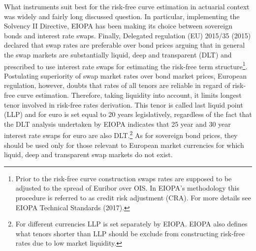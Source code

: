 	What instruments suit best for the risk-free curve estimation in actuarial context was widely and fairly long discussed question.
	In particular, implementing the Solvency II Directive, EIOPA
 has been making its choice between sovereign bonds and interest rate swaps.  
	Finally, Delegated regulation (EU) 2015/35 (2015) declared that swap rates are preferable over bond prices arguing that in general the swap markets are substantially liquid, deep and transparent (DLT) and prescribed to use interest rate swaps for estimating the risk-free term structure\footnote
{
Prior to the risk-free curve construction swaps rates are supposed to be adjusted to the spread of Euribor over OIS. In EIOPA's methodology this procedure is referred to as credit risk adjustment (CRA). For more details see EIOPA Technical Standards (2017). 
}.
	Postulating superiority of swap market rates over bond market prices, European regulation, however, doubts that rates of all tenors are reliable in regard of risk-free curve estimation. Therefore, taking liquidity into account, it limits longest tenor involved in risk-free rates derivation. This tenor is called last liquid point (LLP) and for euro is set equal to 20 years legislatively, regardless of the fact that the DLT analysis undertaken by EIOPA indicates that 25 year and 30 year interest rate swaps for euro are also DLT.\footnote
{
 For different currencies LLP is set separately by EIOPA. EIOPA also defines what tenors shorter than LLP should be exclude from constructing risk-free rates due to low market liquidity. 
}  
	 As for sovereign bond prices, they should be used only for those relevant to European market currencies for which liquid, deep and transparent swap markets do not exist.  
	
